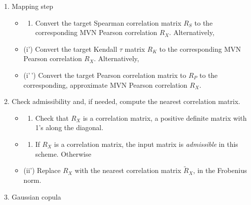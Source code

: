 \documentclass[
]{jss}
\providecommand{\tightlist}{%
  \setlength{\itemsep}{0pt}\setlength{\parskip}{0pt}}
\begin{document}
\begin{enumerate}
\def\labelenumi{\arabic{enumi}.}
\tightlist
\item
  Mapping step

  \begin{itemize}
  \item
    \begin{enumerate}
    \def\labelenumii{(\roman{enumii})}
    \tightlist
    \item
      Convert the target Spearman correlation matrix \(R_S\) to the
      corresponding MVN Pearson correlation \(R_X\). Alternatively,
    \end{enumerate}
  \item
    (i') Convert the target Kendall \(\tau\) matrix \(R_K\) to the
    corresponding MVN Pearson correlation \(R_X\). Alternatively,
  \item
    (i'\,') Convert the target Pearson correlation matrix to \(R_P\) to
    the corresponding, approximate MVN Pearson correlation \(R_X\).
  \end{itemize}
\item
  Check admissibility and, if needed, compute the nearest correlation
  matrix.

  \begin{itemize}
  \item
    \begin{enumerate}
    \def\labelenumii{(\roman{enumii})}
    \tightlist
    \item
      Check that \(R_X\) is a correlation matrix, a positive definite
      matrix with 1's along the diagonal.
    \end{enumerate}
  \item
    \begin{enumerate}
    \def\labelenumii{(\roman{enumii})}
    \setcounter{enumii}{1}
    \tightlist
    \item
      If \(R_X\) is a correlation matrix, the input matrix is
      \emph{admissible} in this scheme. Otherwise
    \end{enumerate}
  \item
    (ii') Replace \(R_X\) with the nearest correlation matrix
    \(\tilde{R}_X\), in the Frobenius norm.
  \end{itemize}
\item
  Gaussian copula


\end{enumerate}
\end{document}
